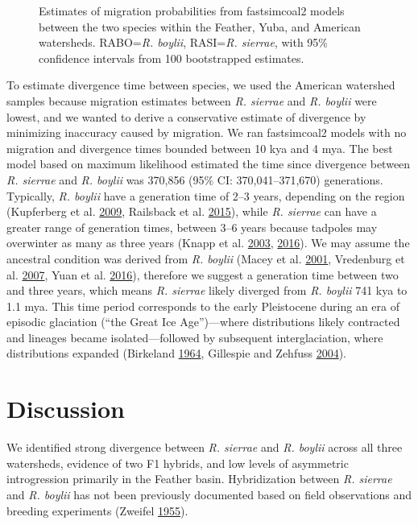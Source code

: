 \documentclass[proquest,12pt,final]{ucthesis-CA2012} %
\begin{document}
\begin{ucmainmatter}
\begin{figure}
\caption{Estimates of migration probabilities from fastsimcoal2
models between the two species within the Feather, Yuba, and American
watersheds. RABO=\emph{R. boylii}, RASI=\emph{R. sierrae}, with 95\%
confidence intervals from 100 bootstrapped estimates.}\label{fig:CH2F6fsc}
\end{figure}
To estimate divergence time between species, we used the American
watershed samples because migration estimates between \emph{R. sierrae}
and \emph{R. boylii} were lowest, and we wanted to derive a conservative
estimate of divergence by minimizing inaccuracy caused by migration. We
ran fastsimcoal2 models with no migration and divergence times bounded
between 10 kya and 4 mya. The best model based on maximum likelihood
estimated the time since divergence between \emph{R. sierrae} and
\emph{R. boylii} was 370,856 (95\% CI: 370,041--371,670) generations.
Typically, \emph{R. boylii} have a generation time of 2--3 years,
depending on the region (Kupferberg et al.
\protect\hyperlink{ref-kupferberg_pulsed_2009}{2009}, Railsback et al.
\protect\hyperlink{ref-railsback_modeling_2015}{2015}), while \emph{R.
sierrae} can have a greater range of generation times, between 3--6
years because tadpoles may overwinter as many as three years (Knapp et
al. \protect\hyperlink{ref-knapp_developing_2003}{2003},
\protect\hyperlink{ref-knapp_large-scale_2016}{2016}). We may assume the
ancestral condition was derived from \emph{R. boylii} (Macey et al.
\protect\hyperlink{ref-macey_molecular_2001}{2001}, Vredenburg et al.
\protect\hyperlink{ref-vredenburg_concordant_2007}{2007}, Yuan et al.
\protect\hyperlink{ref-yuan_spatiotemporal_2016}{2016}), therefore we
suggest a generation time between two and three years, which means
\emph{R. sierrae} likely diverged from \emph{R. boylii} 741 kya to 1.1
mya. This time period corresponds to the early Pleistocene during an era
of episodic glaciation (``the Great Ice Age'')---where distributions
likely contracted and lineages became isolated---followed by subsequent
interglaciation, where distributions expanded (Birkeland
\protect\hyperlink{ref-birkeland_pleistocene_1964}{1964}, Gillespie and
Zehfuss \protect\hyperlink{ref-gillespie_glaciations_2004}{2004}).

\hypertarget{discussion-1}{%
\section{Discussion}\label{discussion-1}}

We identified strong divergence between \emph{R. sierrae} and \emph{R.
boylii} across all three watersheds, evidence of two F1 hybrids, and low
levels of asymmetric introgression primarily in the Feather basin.
Hybridization between \emph{R. sierrae} and \emph{R. boylii} has not
been previously documented based on field observations and breeding
experiments (Zweifel
\protect\hyperlink{ref-zweifel_ecology_1955}{1955}).


\end{ucmainmatter}
\end{document}
